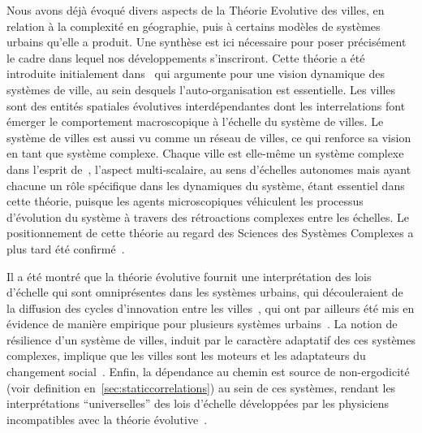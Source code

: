 Nous avons déjà évoqué divers aspects de la Théorie Evolutive des villes, en relation à la complexité en géographie, puis à certains modèles de systèmes urbains qu'elle a produit. Une synthèse est ici nécessaire pour poser précisément le cadre dans lequel nos développements s'inscriront. Cette théorie a été introduite initialement dans~\cite{pumain1997pour} qui argumente pour une vision dynamique des systèmes de ville, au sein desquels l'auto-organisation est essentielle. Les villes sont des entités spatiales évolutives interdépendantes dont les interrelations font émerger le comportement macroscopique à l'échelle du système de villes. Le système de villes est aussi vu comme un réseau de villes, ce qui renforce sa vision en tant que système complexe. Chaque ville est elle-même un système complexe dans l'esprit de~\cite{berry1964cities}, l'aspect multi-scalaire, au sens d'échelles autonomes mais ayant chacune un rôle spécifique dans les dynamiques du système, étant essentiel dans cette théorie, puisque les agents microscopiques véhiculent les processus d'évolution du système à travers des rétroactions complexes entre les échelles. Le positionnement de cette théorie au regard des Sciences des Systèmes Complexes a plus tard été confirmé~\cite{pumain2003approche}.

Il a été montré que la théorie évolutive fournit une interprétation des lois d'échelle qui sont omniprésentes dans les systèmes urbains, qui découleraient de la diffusion des cycles d'innovation entre les villes~\cite{pumain2006evolutionary}, qui ont par ailleurs été mis en évidence de manière empirique pour plusieurs systèmes urbains~\cite{pumain2009innovation}. La notion de résilience d'un système de villes, induit par le caractère adaptatif des ces systèmes complexes, implique que les villes sont les moteurs et les adaptateurs du changement social~\cite{pumain2010theorie}. Enfin, la dépendance au chemin est source de non-ergodicité (voir definition en~\ref{sec:staticcorrelations}) au sein de ces systèmes, rendant les interprétations ``universelles'' des lois d'échelle développées par les physiciens incompatibles avec la théorie évolutive~\cite{pumain2010theorie}.


